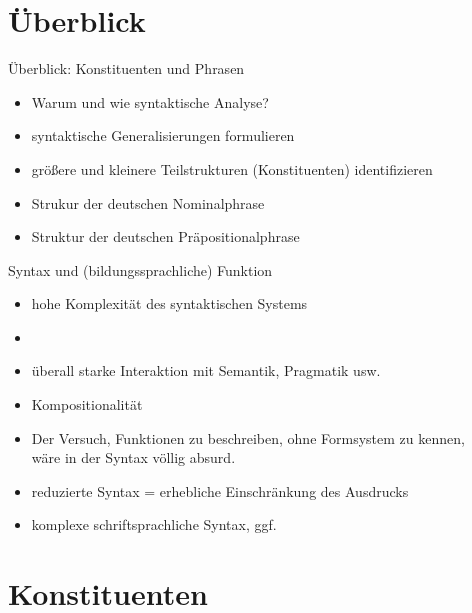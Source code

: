

\section{Überblick}

\begin{frame}
  {Überblick: Konstituenten und Phrasen}
  \pause
  \begin{itemize}[<+->]
    \item Warum und wie syntaktische Analyse?
    \item syntaktische Generalisierungen formulieren
    \item größere und kleinere Teilstrukturen (Konstituenten) identifizieren
      \Zeile
    \item Strukur der deutschen \alert{Nominalphrase}
    \item Struktur der deutschen \alert{Präpositionalphrase}
  \end{itemize}
\end{frame}

\begin{frame}
  {Syntax und (bildungssprachliche) Funktion}
  \pause
  \begin{itemize}[<+->]
    \item \alert{hohe Komplexität} des syntaktischen Systems
    \item {}
    \item überall \alert{starke Interaktion mit Semantik, Pragmatik usw.}
    \item \alert{Kompositionalität}
      \Zeile
    \item Der Versuch, Funktionen zu beschreiben, ohne Formsystem zu kennen,\\
      wäre in der Syntax völlig absurd.
      \Zeile
    \item reduzierte Syntax = erhebliche Einschränkung des Ausdrucks
    \item komplexe schriftsprachliche Syntax, ggf.\ 
  \end{itemize}
\end{frame}


\section{Konstituenten}


